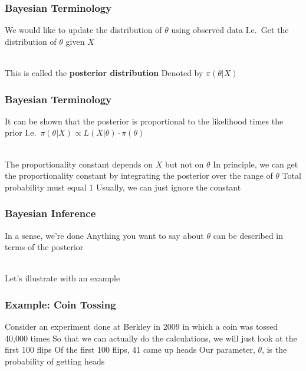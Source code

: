 \documentclass{beamer}
\begin{document}
\begin{frame}
    \frametitle{Bayesian Terminology}

    \begin{outline}
        \1<+-> We would like to update the distribution of $\theta$ using observed data
            \2<+-> I.e.\ Get the distribution of $\theta$ given $X$\\~\
        
        \1<+-> This is called the \textbf{posterior distribution}
            \2<+-> Denoted by $\pi(\theta | X)$
    \end{outline}
\end{frame}

\begin{frame}
    \frametitle{Bayesian Terminology}

    \begin{outline}
        \1<+-> It can be shown that the posterior is proportional to the likelihood times the prior
            \2<+-> I.e.\ $\pi(\theta | X) \propto L(X | \theta) \cdot \pi(\theta)$\\~\

        \1<+-> The proportionality constant depends on $X$ but not on $\theta$
        \1<+-> In principle, we can get the proportionality constant by integrating the posterior over the range of $\theta$
            \2<+-> Total probability must equal 1
        \1<+-> Usually, we can just ignore the constant
    \end{outline}
\end{frame}

\begin{frame}
    \frametitle{Bayesian Inference}\pause

    \begin{outline}
        \1<+-> In a sense, we're done
        \1<+-> Anything you want to say about $\theta$ can be described in terms of the posterior\\~\

        \1<+-> Let's illustrate with an example
    \end{outline}
\end{frame}

\begin{frame}
    \frametitle{Example: Coin Tossing}\pause

    \begin{outline}
        \1<+-> Consider an experiment done at Berkley in 2009 in which a coin was tossed 40,000 times
            \2<+-> So that we can actually do the calculations, we will just look at the first 100 flips
            \2<+-> Of the first 100 flips, 41 came up heads
        \1<+-> Our parameter, $\theta$, is the probability of getting heads
    \end{outline}
\end{frame}
\end{document}
